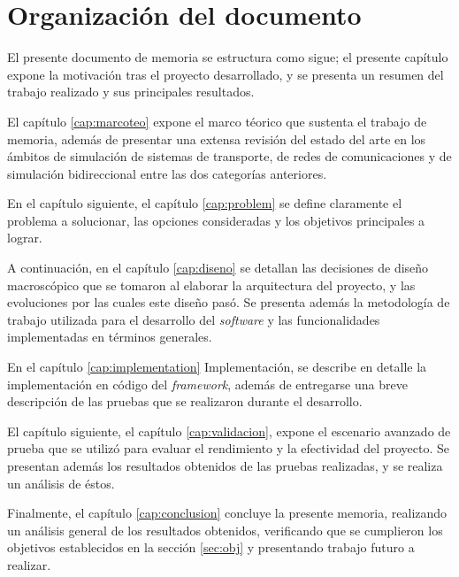 \section{Organización del documento}

El presente documento de memoria se estructura como sigue; el presente capítulo expone la motivación tras el proyecto desarrollado, y se presenta un resumen del trabajo realizado y sus principales resultados.

El capítulo \ref{cap:marcoteo} expone el marco téorico que sustenta el trabajo de memoria, además de presentar una extensa revisión del estado del arte en los ámbitos de simulación de sistemas de transporte, de redes de comunicaciones y de simulación bidireccional entre las dos categorías anteriores.

En el capítulo siguiente, el capítulo \ref{cap:problem} se define claramente el problema a solucionar, las opciones consideradas y los objetivos principales a lograr.

A continuación, en el capítulo \ref{cap:diseno} se detallan las decisiones de diseño macroscópico que se tomaron al elaborar la arquitectura del proyecto, y las evoluciones por las cuales este diseño pasó. Se presenta además la metodología de trabajo utilizada para el desarrollo del \emph{software} y las funcionalidades implementadas en términos generales.

En el capítulo \ref{cap:implementation} Implementación, se describe en detalle la implementación en código del \emph{framework}, además de entregarse una breve descripción de las pruebas que se realizaron durante el desarrollo.

El capítulo siguiente, el capítulo \ref{cap:validacion}, expone el escenario avanzado de prueba que se utilizó para evaluar el rendimiento y la efectividad del proyecto. Se presentan además los resultados obtenidos de las pruebas realizadas, y se realiza un análisis de éstos.

Finalmente, el capítulo \ref{cap:conclusion} concluye la presente memoria, realizando un análisis general de los resultados obtenidos, verificando que se cumplieron los objetivos establecidos en la sección \ref{sec:obj} y presentando trabajo futuro a realizar.

